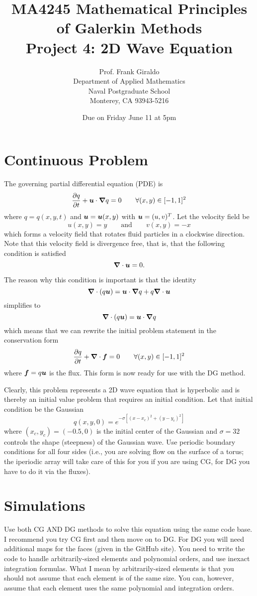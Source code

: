 \documentclass[10pt]{article}
\newcommand{\diff}[2] {\frac{\partial #1}{\partial #2}}
\newcommand{\vc}[1]{\mbox{\boldmath$#1$\unboldmath}}
\newcommand{\grad}{\vc{\nabla}}
\begin{document}
\title{MA4245 Mathematical Principles of Galerkin Methods \\
Project 4: 2D Wave Equation}
\author{Prof. Frank Giraldo \\
Department of Applied Mathematics \\
Naval Postgraduate School \\
Monterey, CA 93943-5216}
\date{Due on Friday June 11 at 5pm}

\maketitle


\section{Continuous Problem}
The governing partial differential equation (PDE) is
\[
\diff{q}{t} + \vc{u} \cdot \grad q = 0 \qquad \forall (x,y) \in [-1,1]^2
\]
where $q=q(x,y,t)$ and $\vc{u}=\vc{u}(x,y)$ with $\vc{u}=(u,v)^T$. Let the velocity field be 
\[
u(x,y)=y \qquad \mathrm{and} \qquad v(x,y)=-x
\]
which forms a velocity field that rotates fluid particles in a clockwise direction. Note that this velocity field is divergence free, that is, 
that the following condition is satisfied
\[
\grad \cdot \vc{u}=0.
\]

The reason why this condition is important is that the identity
\[
\grad \cdot ( q \vc{u} ) = \vc{u} \cdot \grad q + q \grad \cdot \vc{u} 
\]
simplifies to 
\[
\grad \cdot ( q \vc{u} ) = \vc{u} \cdot \grad q
\]
which means that we can rewrite the initial problem statement in the conservation form
\[
\diff{q}{t} + \grad \cdot \vc{f} = 0 \qquad \forall (x,y) \in [-1,1]^2
\]
where $\vc{f}=q \vc{u}$ is the flux. This form is now ready for use with the DG method.

Clearly, this problem represents a 2D wave equation that is hyperbolic and is thereby an initial value problem that requires an initial condition. 
Let that initial condition be the Gaussian
\[
q(x,y,0)= e ^{ - \sigma\left[ (x-x_c)^2 + (y-y_c)^2 \right] }
\]
where $(x_c,y_c)=(-0.5,0)$ is the initial center of the Gaussian and $\sigma=32$ controls the shape (steepness) of the Gaussian wave.
Use periodic boundary conditions for all four sides (i.e., you are solving flow on the surface of a torus; the iperiodic array will take care of this for you if you are using CG, for DG you have to do it via the fluxes).

\section{Simulations}
Use both CG AND DG methods to solve this equation using the same code base. I
recommend you try CG first and then move on to DG. For DG you will
need additional maps 
for the faces (given in the GitHub site). 
You need to write the code to handle arbitrarily-sized elements and polynomial orders, and use inexact integration formulas. What I mean by arbitrarily-sized elements is that you should not assume that each element is of the same size. You can, however, assume that each element uses the same polynomial and integration orders.
\end{document}
